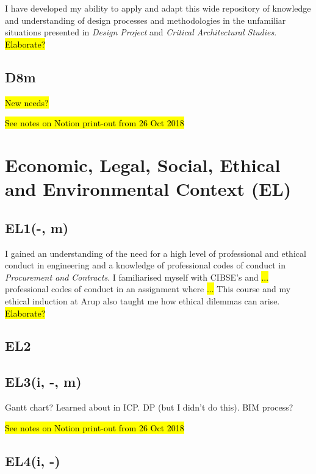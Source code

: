 I have developed my ability to apply and adapt this wide repository of knowledge and understanding of design processes and methodologies in the unfamiliar situations presented in \textit{Design Project} and \textit{Critical Architectural Studies}.
\hl{Elaborate?}


\subsection*{D8m}

\hl{New needs?}

\hl{See notes on Notion print-out from 26 Oct 2018}



\section{Economic, Legal, Social, Ethical and Environmental Context (EL)}

\subsection*{EL1(-, m)}

I gained an understanding of the need for a high level of professional and ethical conduct in engineering and a knowledge of professional codes of conduct in \textit{Procurement and Contracts}.
I familiarised myself with CIBSE's and \hl{...} professional codes of conduct in an assignment where \hl{...}
This course and my ethical induction at Arup also taught me how ethical dilemmas can arise.
\hl{Elaborate?}


\subsection*{EL2}


\subsection*{EL3(i, -, m)}

Gantt chart? Learned about in ICP.
DP (but I didn't do this).
BIM process?

\hl{See notes on Notion print-out from 26 Oct 2018}


\subsection*{EL4(i, -)}


